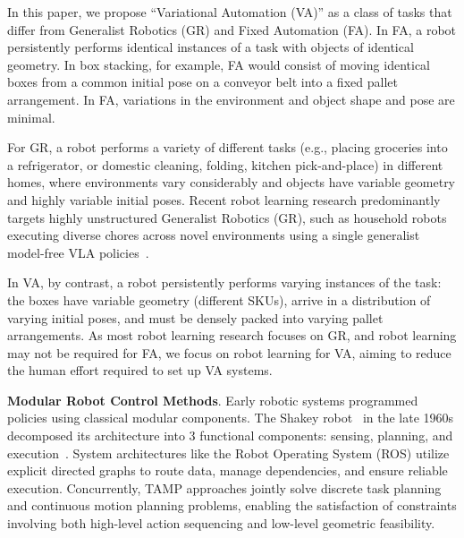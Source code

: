 In this paper, we propose ``Variational Automation (VA)'' as a class of tasks that differ from Generalist Robotics (GR) and Fixed Automation (FA). In FA, a robot persistently performs identical instances of a task with objects of identical geometry. In box stacking, for example, FA would consist of moving identical boxes from a common initial pose on a conveyor belt into a fixed pallet arrangement. In FA, variations in the environment and object shape and pose are minimal. 

For GR, a robot performs a variety of different tasks (e.g., placing groceries into a refrigerator, or 
domestic cleaning, folding, kitchen pick-and-place) in different homes, where environments vary considerably and objects have variable geometry and highly variable initial poses. Recent robot learning research predominantly targets highly unstructured Generalist Robotics (GR), such as household robots executing diverse chores across novel environments using a single generalist model-free VLA policies~\cite{levine2016end, chi2025diffusion, kim24openvla, pi0_2024, black2025pi_}.

In VA, by contrast, a robot persistently performs varying instances of the task: the boxes have variable geometry (different SKUs), arrive in a distribution of varying initial poses, and must be densely packed into varying pallet arrangements. As most robot learning research focuses on GR, and robot learning may not be required for FA, we focus on robot learning for VA, aiming to reduce the human effort required to set up VA systems.

\textbf{Modular Robot Control Methods}.
Early robotic systems programmed policies using classical modular components. The Shakey robot~\cite{nilsson1998artificial} in the late 1960s
decomposed its architecture into 3 functional components:
sensing, planning, and execution~\cite{nilsson2014principles}. System architectures like the Robot Operating System (ROS) \cite{macenski2022robot} utilize explicit directed graphs to route data, manage dependencies, and ensure reliable execution.
Concurrently, TAMP \cite{kaelbling2011hierarchical,garrett2021integrated} approaches jointly solve discrete task planning and continuous motion planning problems, enabling the satisfaction of constraints involving both high-level action sequencing and low-level geometric feasibility.


